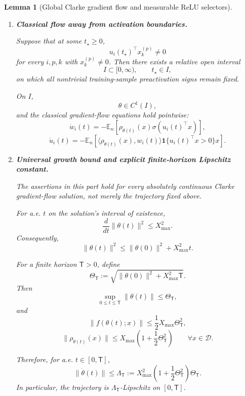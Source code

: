 \documentclass{article} %
\theoremstyle{plain}
\newtheorem{lemma}[theorem]{Lemma}
\theoremstyle{definition}
\theoremstyle{remark}
\begin{document}
\begin{lemma}[Global Clarke gradient flow and measurable ReLU selectors]
\begin{enumerate}[label=(\roman*),leftmargin=2.4em]
For a.e. $t\ge0$ and every $i\in[h]$,
\[
\dot w_i(t)
=
-
\mathbb E_n
\left[
\rho_{\theta(t)}(x)
\sigma(u_i(t)^\top x)
\right],
\]
and
\[
\dot u_i(t)
=
-
\mathbb E_n
\left[
\langle
\rho_{\theta(t)}(x),
w_i(t)
\rangle
\alpha_i(t;x)x
\right].
\]
Moreover, for every $t\ge0$ and every training sample,
\[
\boxed{
\alpha_i(t;x)u_i(t)^\top x
=
\sigma(u_i(t)^\top x).
}
\]

Consequently,
\[
Q_i^\alpha(t)
:=
\mathbb E_n
\left[
xx^\top\alpha_i(t;x)
\right]
\]
is Lebesgue measurable and obeys the operator sandwich
\[
\boxed{
0
\preceq
Q_i^\alpha(t)
\preceq
\Sigma_n
}
\qquad
\forall t\ge0.
\]

\item
\textbf{Classical flow away from activation boundaries.}

Suppose that at some $t_\star\ge0$,
\[
u_i(t_\star)^\top x_k^{(p)}
\neq0
\]
for every $i,p,k$ with $x_k^{(p)}\neq0$. Then there exists a relative open
interval
\[
I\subset[0,\infty),
\qquad
t_\star\in I,
\]
on which all nontrivial training-sample preactivation signs remain fixed.

On $I$,
\[
\theta\in C^1(I),
\]
and the classical gradient-flow equations hold pointwise:
\[
\dot w_i(t)
=
-
\mathbb E_n
\left[
\rho_{\theta(t)}(x)
\sigma(u_i(t)^\top x)
\right],
\]
\[
\dot u_i(t)
=
-
\mathbb E_n
\left[
\langle
\rho_{\theta(t)}(x),
w_i(t)
\rangle
\mathbf 1\{u_i(t)^\top x>0\}x
\right].
\]

\item
\textbf{Universal growth bound and explicit finite-horizon Lipschitz
constant.}

The assertions in this part hold for every absolutely continuous Clarke
gradient-flow solution, not merely the trajectory fixed above.

For a.e. $t$ on the solution's interval of existence,
\[
\frac{d}{dt}\|\theta(t)\|^2
\le
X_{\max}^2.
\]
Consequently,
\[
\boxed{
\|\theta(t)\|^2
\le
\|\theta(0)\|^2
+
X_{\max}^2t.
}
\]

For a finite horizon $\mathsf T>0$, define
\[
\Theta_{\mathsf T}
:=
\sqrt{
\|\theta(0)\|^2
+
X_{\max}^2\mathsf T
}.
\]
Then
\[
\sup_{0\le t\le\mathsf T}
\|\theta(t)\|
\le
\Theta_{\mathsf T},
\]
and
\[
\|f(\theta(t);x)\|
\le
\frac12
X_{\max}
\Theta_{\mathsf T}^2,
\]
\[
\|\rho_{\theta(t)}(x)\|
\le
X_{\max}
\left(
1+\frac12\Theta_{\mathsf T}^2
\right)
\qquad
\forall x\in\mathcal D.
\]

Therefore, for a.e. $t\in[0,\mathsf T]$,
\[
\boxed{
\|\dot\theta(t)\|
\le
\Lambda_{\mathsf T}
:=
X_{\max}^2
\left(
1+\frac12\Theta_{\mathsf T}^2
\right)
\Theta_{\mathsf T}.
}
\]
In particular, the trajectory is
$\Lambda_{\mathsf T}$-Lipschitz on $[0,\mathsf T]$.


\end{enumerate}
\end{lemma}
\end{document}
